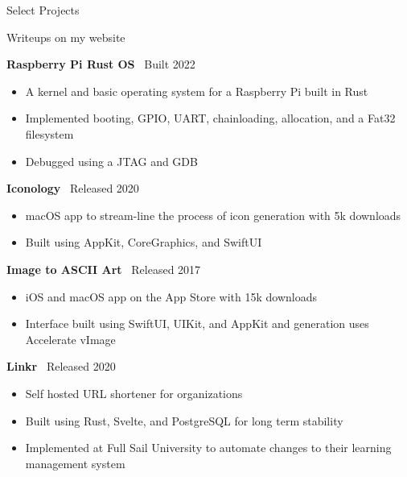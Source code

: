 \documentclass{resume}
\newif\ifisDigital
\begin{document}
\begin{rSection}{Select Projects}

\ifisDigital
\vspace{-1.25em}
\else
Writeups on my website
\fi

\item \textbf{Raspberry Pi Rust OS} \ {Built 2022} 
\ifisDigital\hfill\href{https://liamrosenfeld.com/projects/rustos/}{Writeup}\fi
\begin{itemize}
    \itemsep -3pt {}
    \vspace{-0.35em}
    \item A kernel and basic operating system for a Raspberry Pi built in Rust
    \item Implemented booting, GPIO, UART, chainloading, allocation, and a Fat32 filesystem
    \item Debugged using a JTAG and GDB
\end{itemize}

\item \textbf{Iconology} \ {Released 2020} 
\ifisDigital\hfill\href{https://liamrosenfeld.com/projects/iconology}{Writeup}\fi
\begin{itemize}
    \itemsep -3pt {}
    \vspace{-0.35em}
    \item macOS app to stream-line the process of icon generation with 5k downloads
    \item Built using AppKit, CoreGraphics, and SwiftUI
\end{itemize}

\item \textbf{Image to ASCII Art} \ {Released 2017}
\ifisDigital\hfill \href{https://liamrosenfeld.com/projects/ascii-art/}{Writeup}\fi
\begin{itemize}
    \itemsep -3pt {} 
    \vspace{-0.35em}
    \item iOS and macOS app on the App Store with 15k downloads
    \item Interface built using SwiftUI, UIKit, and AppKit and generation uses Accelerate vImage
\end{itemize}

\item \textbf{Linkr} \ {Released 2020}
\ifisDigital\hfill \href{https://liamrosenfeld.com/projects/linkr/}{Writeup}\fi
\begin{itemize}
    \itemsep -3pt {} 
    \vspace{-0.35em}
    \item Self hosted URL shortener for organizations
    \item Built using Rust, Svelte, and PostgreSQL for long term stability
    \item Implemented at Full Sail University to automate changes to their learning management system
\end{itemize}


\end{rSection}
\end{document}
